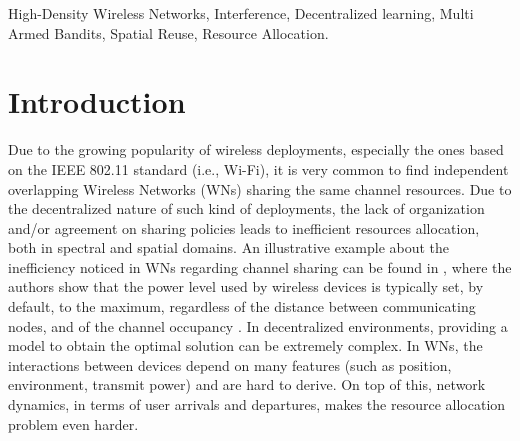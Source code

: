 \documentclass[preprint,12pt]{elsarticle}
\begin{document}
\begin{frontmatter}
\begin{keyword}
High-Density Wireless Networks, Interference, Decentralized learning, Multi Armed Bandits, Spatial Reuse, Resource Allocation.
\end{keyword}

\end{frontmatter}


\newpage

\section{Introduction}
\label{section:introduction}
Due to the growing popularity of wireless deployments, especially the ones based on the IEEE 802.11 standard (i.e., Wi-Fi), it is very common to find independent overlapping Wireless Networks (WNs) sharing the same channel resources. Due to the decentralized nature of such kind of deployments, the lack of organization and/or agreement on sharing policies leads to inefficient resources allocation, both in spectral and spatial domains. An illustrative example about the inefficiency noticed in WNs regarding channel sharing can be found in \cite{akella2007self}, where the authors show that the power level used by wireless devices is typically set, by default, to the maximum, regardless of the distance between communicating nodes, and of the channel occupancy \cite{akella2007self}. In decentralized environments, providing a model to obtain the optimal solution can be extremely complex. In WNs, the interactions between devices depend on many features (such as position, environment, transmit power) and are hard to derive. On top of this, network dynamics, in terms of user arrivals and departures, makes the resource allocation problem even harder. 
\end{document}
